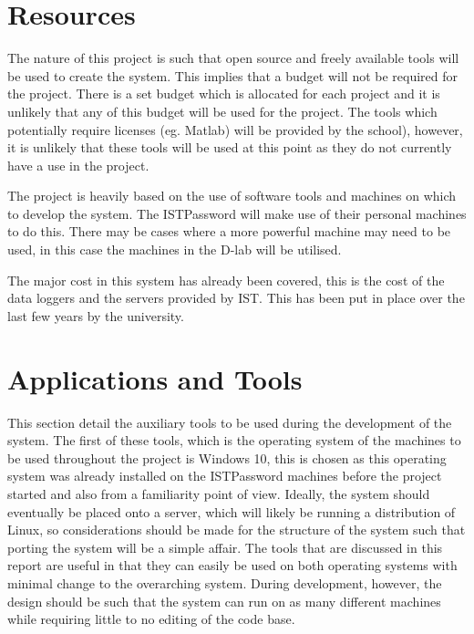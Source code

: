 \documentclass[12pt,onecolumn]{IEEEtran}
\begin{document}

\section{Resources} \label{sec:Resources}
The nature of this project is such that open source and freely available tools will be used to create the system. This implies that a budget will not be required for the project. There is a set budget which is allocated for each project and it is unlikely that any of this budget will be used for the project.
The tools which potentially require licenses (eg. Matlab) will be provided by the school), however, it is unlikely that these tools will be used at this point as they do not currently have a use in the project. 

The project is heavily based on the use of software tools and machines on which to develop the system. The ISTPassword will make use of their personal machines to do this. There may be cases where a more powerful machine may need to be used, in this case the machines in the D-lab will be utilised. 

The major cost in this system has already been covered, this is the cost of the data loggers and the servers provided by IST. This has been put in place over the last few years by the university.





\section{Applications and Tools} \label{sec:ApplicationsAndTools}

This section detail the auxiliary tools to be used during the development of the system.
The first of these tools, which is the operating system of the machines to be used throughout the project is Windows 10, this is chosen as this operating system was already installed on the ISTPassword machines before the project started and also from a familiarity point of view. 
Ideally, the system should eventually be placed onto a server, which will likely be running a distribution of Linux, so considerations should be made for the structure of the system such that porting the system will be a simple affair. 
The tools that are discussed in this report are useful in that they can easily be used on both operating systems with minimal change to the overarching system. 
During development, however, the design should be such that the system can run on as many different machines while requiring little to no editing of the code base.
\end{document}
